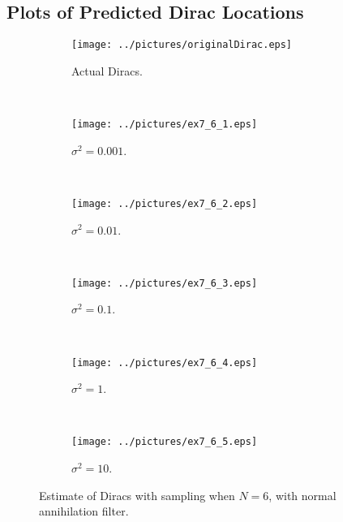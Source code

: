 \documentclass[11pt,a4paper]{report}
\begin{document}
\subsection{Plots of Predicted Dirac Locations}
\begin{figure}[!ht]
    \captionsetup[subfigure]{position=b}
    \centering
    \begin{subfigure}{0.49\textwidth}
        \texttt{[image: ../pictures/originalDirac.eps]}
        \caption{Actual Diracs.}
        \label{fig:ex7_6_0}
    \end{subfigure}
    ~
    \begin{subfigure}{0.49\textwidth}
        \texttt{[image: ../pictures/ex7\_6\_1.eps]}
        \caption{$\sigma^2 = 0.001$.}
        \label{fig:ex7_6_1}
    \end{subfigure}
    \\
    \begin{subfigure}{0.49\textwidth}
        \texttt{[image: ../pictures/ex7\_6\_2.eps]}
        \caption{$\sigma^2 = 0.01$.}
        \label{fig:ex7_6_2}
    \end{subfigure}
    ~
    \begin{subfigure}{0.49\textwidth}
        \texttt{[image: ../pictures/ex7\_6\_3.eps]}
        \caption{$\sigma^2 = 0.1$.}
        \label{fig:ex7_6_3}
    \end{subfigure}
    \\
    \begin{subfigure}{0.49\textwidth}
        \texttt{[image: ../pictures/ex7\_6\_4.eps]}
        \caption{$\sigma^2 = 1$.}
        \label{fig:ex7_6_4}
    \end{subfigure}
    ~
    \begin{subfigure}{0.49\textwidth}
        \texttt{[image: ../pictures/ex7\_6\_5.eps]}
        \caption{$\sigma^2 = 10$.}
        \label{fig:ex7_6_5}
    \end{subfigure}

    \caption{Estimate of Diracs with sampling when $N = 6$, with normal annihilation filter.}
    \label{fig:ex7_6}
\end{figure}
\end{document}
